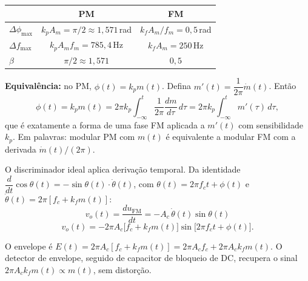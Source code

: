 \documentclass[11pt,a4paper]{article}
\begin{document}
\begin{resolucao}

\begin{center}
\begin{tabular}{lcc}
\toprule
& PM & FM \\
\midrule
$\Delta\phi_{\max}$ & $k_p A_m = \pi/2 \approx 1{,}571$\,rad & $k_f A_m / f_m = 0{,}5$\,rad \\
$\Delta f_{\max}$   & $k_p A_m f_m = 785{,}4$\,Hz & $k_f A_m = 250$\,Hz \\
$\beta$             & $\pi/2 \approx 1{,}571$ & $0{,}5$ \\
\bottomrule
\end{tabular}
\end{center}

\textbf{Equivalência:} no PM, $\phi(t) = k_p m(t)$. Defina $m'(t) = \dfrac{1}{2\pi}\dot m(t)$. Então
\[
  \phi(t) = k_p m(t) = 2\pi k_p \int_{-\infty}^{t}\frac{1}{2\pi}\frac{dm}{d\tau}\,d\tau = 2\pi k_p \int_{-\infty}^{t} m'(\tau)\,d\tau,
\]
que é exatamente a forma de uma fase FM aplicada a $m'(t)$ com sensibilidade $k_p$. Em palavras: modular PM com $m(t)$ é equivalente a modular FM com a derivada $\dot m(t)/(2\pi)$.
\end{resolucao}

\begin{resolucao}

O discriminador ideal aplica derivação temporal. Da identidade $\dfrac{d}{dt}\cos\theta(t) = -\sin\theta(t)\cdot\dot\theta(t)$, com $\theta(t) = 2\pi f_c t + \phi(t)$ e $\dot\theta(t) = 2\pi[f_c + k_f m(t)]$:
\[
  v_o(t) = \frac{du_{\text{FM}}}{dt} = -A_c\,\dot\theta(t)\sin\theta(t)
\]
\[
  \boxed{v_o(t) = -2\pi A_c\big[f_c + k_f m(t)\big]\sin\!\big[2\pi f_c t + \phi(t)\big].}
\]

O envelope é $E(t) = 2\pi A_c[f_c + k_f m(t)] = 2\pi A_c f_c + 2\pi A_c k_f m(t)$. O detector de envelope, seguido de capacitor de bloqueio de DC, recupera o sinal $2\pi A_c k_f m(t) \propto m(t)$, sem distorção.
\end{resolucao}
\end{document}
